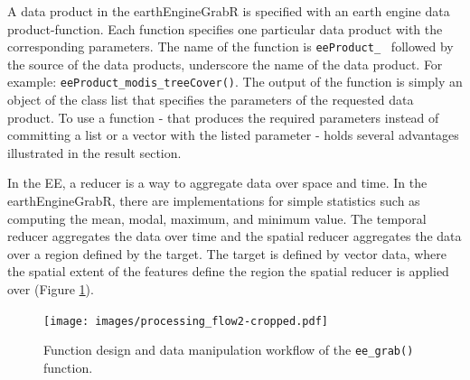 A data product in the earthEngineGrabR is specified with an earth engine data product-function. Each function specifies one particular data product with the corresponding parameters. The name of the function is \texttt{eeProduct\_ } followed by the source of the data products, underscore the name of the data product. For example: \texttt{eeProduct\_modis\_treeCover()}. The output of the function is simply an object of the class list that specifies the parameters of the requested data product. To use a function - that produces the required parameters instead of committing a list or a vector with the listed parameter - holds several advantages illustrated in the result section.

In the EE, a reducer is a way to aggregate data over space and time. In the earthEngineGrabR, there are implementations for simple statistics such as computing the mean, modal, maximum, and minimum value. The temporal reducer aggregates the data over time and the spatial reducer aggregates the data over a region defined by the target. 
The target is defined by vector data, where the spatial extent of the features define the region the spatial reducer is applied over (Figure \ref*{Workflow}).

\begin{center}
	\begin{figure}[h]
		\begin{center}
			\texttt{[image: images/processing\_flow2-cropped.pdf]}
			\caption{Function design and data manipulation workflow of the \texttt{ee\_grab()} function.}
			\label{Workflow}
		\end{center}
	\end{figure}
\end{center}

